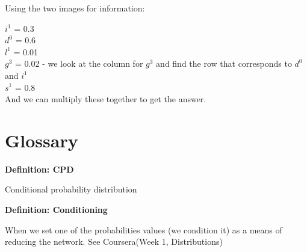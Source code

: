\documentclass[11pt]{report}
\newcommand{\define}[2] {
  \textbf{Definition: #1}
  \begin{center} #2
\end{center}
}
\begin{document}
Using the two images for information:

$i^1$ = 0.3 \\
$d^0$ = 0.6 \\
$l^1$ = 0.01 \\
$g^3$ = 0.02 - we look at the column for $g^3$ and find the row that corresponds to $d^0$ and $i^1$\\
$s^1$ = 0.8 \\

And we can multiply these together to get the answer. 


\chapter{Glossary}
\define{CPD}{Conditional probability distribution}
\define{Conditioning}{When we set one of the probabilities values (we condition it) as a means of reducing the network. See Coursera(Week 1, Distributions)}
\end{document}
